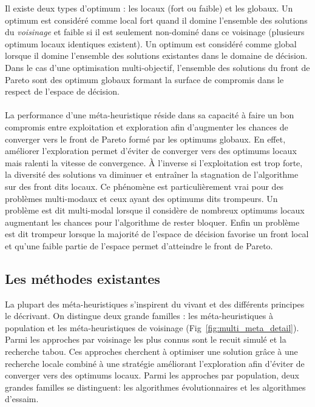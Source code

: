 \begin{Def}\label{def:optimum}
Il existe deux types d’optimum : les locaux (fort ou faible) et les globaux. Un optimum
est considéré comme local fort quand il domine l’ensemble des solutions du
\emph{voisinage} et faible si il est seulement non-dominé dans ce voisinage (plusieurs
optimum locaux identiques existent). Un optimum est considéré comme global lorsque il
domine l’ensemble des solutions existantes dans le domaine de décision. Dans le cas d’une
optimisation multi-objectif, l’ensemble des solutions du front de Pareto sont des optimum
globaux formant la surface de compromis dans le respect de l’espace de décision.
\end{Def}

\paragraph{} %
La performance d’une méta-heuristique réside dans sa capacité à faire un bon compromis
entre exploitation et exploration afin d’augmenter les chances de converger vers le front
de Pareto formé par les optimums globaux. En effet, améliorer l’exploration permet
d’éviter de converger vers des optimums locaux mais ralenti la vitesse de convergence. À
l’inverse si l’exploitation est trop forte, la diversité des solutions va diminuer et
entraîner la stagnation de l’algorithme sur des front dits locaux. Ce phénomène est
particulièrement vrai pour des problèmes multi-modaux et ceux ayant des optimums dits
trompeurs. Un problème est dit multi-modal lorsque il considère de nombreux optimums
locaux augmentant les chances pour l’algorithme de rester bloquer. Enfin un problème est
dit trompeur lorsque la majorité de l’espace de décision favorise un front local et qu’une
faible partie de l’espace permet d’atteindre le front de Pareto.


\subsection{Les méthodes existantes} %
\label{sub:les_methodes_existantes}
La plupart des méta-heuristiques s’inspirent du vivant et des différents principes
le décrivant. On distingue deux grande familles : les méta-heuristiques à population
et les méta-heuristiques de voisinage (Fig~\ref{fig:multi_meta_detail}). Parmi
les approches par voisinage les plus connus sont le recuit simulé et la recherche tabou.
Ces approches cherchent à optimiser une solution grâce à une recherche locale combiné
à une stratégie améliorant l’exploration afin d’éviter de converger vers des optimums locaux.
Parmi les approches par population, deux grandes familles se distinguent: les algorithmes
évolutionnaires et les algorithmes d’essaim.

